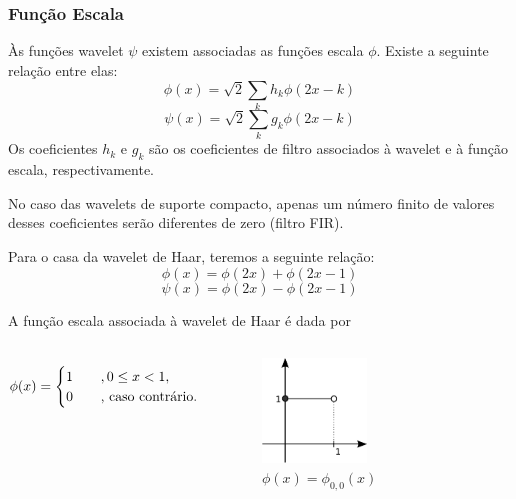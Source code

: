 \begin{frame}[allowframebreaks]
  \frametitle{Função Escala}
  Às funções wavelet $\psi$ existem associadas as funções escala $\phi$.
  Existe a seguinte relação entre elas:
  \begin{equation}
        \phi(x) = \sqrt{2} \sum_k h_k \phi(2x -k)
  \end{equation}
  \begin{equation}
        \psi(x) = \sqrt{2} \sum_k g_k \phi(2x -k)
  \end{equation}
  Os coeficientes $h_k$ e $g_k$ são os coeficientes de filtro associados 
  à wavelet e à função escala, respectivamente.

  No caso das wavelets de suporte compacto, apenas um número finito de valores
  desses coeficientes serão diferentes de zero (filtro FIR). 

  \framebreak 

  Para o casa da wavelet de Haar, teremos a seguinte relação:
  \begin{equation}
  \phi(x) = \phi(2x) + \phi(2x - 1)
  \end{equation}
  \begin{equation}
  \psi(x) = \phi(2x) - \phi(2x - 1)
  \end{equation}

  A função escala associada à wavelet de Haar é dada por
  \begin{columns}[c]
    \begin{equation}
        \phi(x) = \begin{cases} 1 \quad & , 0 \leq x < 1 ,\\
     0 &  \textmd{, caso contrário.} \end{cases}
    \end{equation}
    \begin{figure}[htp]
    \centering
    \includegraphics[width=0.5\textwidth]{images/haar_escala_00.pdf}
    \caption{$\phi(x) = \phi_{0,0}(x)$}
    \label{fig-haar_escala_00}
    \end{figure}
  \end{columns} 
\end{frame}

